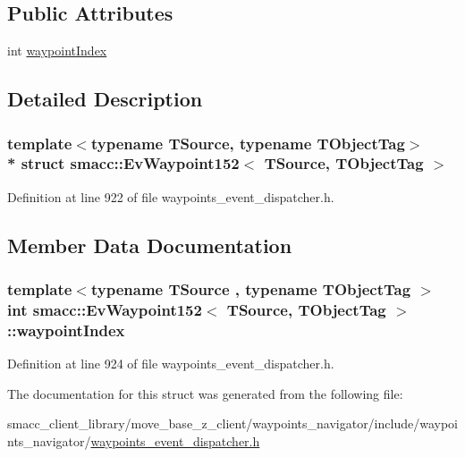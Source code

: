 \subsection*{Public Attributes}
\begin{DoxyCompactItemize}
\item 
int \hyperlink{structsmacc_1_1EvWaypoint152_a3c9af0675576856a446e51ffdf1a2310}{waypoint\+Index}
\end{DoxyCompactItemize}


\subsection{Detailed Description}
\subsubsection*{template$<$typename T\+Source, typename T\+Object\+Tag$>$\\*
struct smacc\+::\+Ev\+Waypoint152$<$ T\+Source, T\+Object\+Tag $>$}



Definition at line 922 of file waypoints\+\_\+event\+\_\+dispatcher.\+h.



\subsection{Member Data Documentation}
\subsubsection[{\texorpdfstring{waypoint\+Index}{waypointIndex}}]{\setlength{\rightskip}{0pt plus 5cm}template$<$typename T\+Source , typename T\+Object\+Tag $>$ int {\bf smacc\+::\+Ev\+Waypoint152}$<$ T\+Source, T\+Object\+Tag $>$\+::waypoint\+Index}\hypertarget{structsmacc_1_1EvWaypoint152_a3c9af0675576856a446e51ffdf1a2310}{}\label{structsmacc_1_1EvWaypoint152_a3c9af0675576856a446e51ffdf1a2310}


Definition at line 924 of file waypoints\+\_\+event\+\_\+dispatcher.\+h.



The documentation for this struct was generated from the following file\+:\begin{DoxyCompactItemize}
\item 
smacc\+\_\+client\+\_\+library/move\+\_\+base\+\_\+z\+\_\+client/waypoints\+\_\+navigator/include/waypoints\+\_\+navigator/\hyperlink{waypoints__event__dispatcher_8h}{waypoints\+\_\+event\+\_\+dispatcher.\+h}\end{DoxyCompactItemize}
